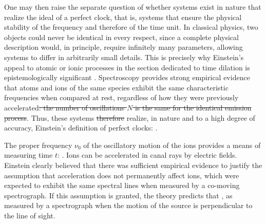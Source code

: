 \documentclass[pdflatex]{sn-jnl} %
\newcommand{\me}{; my emphasis}
\providecommand{\DIFdel}[1]{{\protect\color{red}\sout{#1}}}                      %
\providecommand{\DIFdelbegin}{} %
\providecommand{\DIFdelend}{} %
\begin{document}
One may then raise the separate question of whether systems exist in nature that realize the ideal of a perfect clock, that is, systems that ensure the physical stability of the frequency and therefore of the time unit. In classical physics, two objects could never be identical in every respect, since a complete physical description would, in principle, require infinitely many parameters, allowing systems to differ in arbitrarily small details. This is precisely why Einstein’s appeal to atomic or ionic processes in the section dedicated to time dilation is epistemologically significant \citep{Pierseaux2003}. Spectroscopy provides strong empirical evidence that atoms and ions of the same species exhibit the same characteristic frequencies when compared at rest, regardless of how they were previously accelerated\DIFdelbegin \DIFdel{: the number of oscillations $N$ is the same for the identical emission process}\DIFdelend . Thus, these systems \DIFdelbegin \DIFdel{therefore }\DIFdelend realize, in nature and to a high degree of accuracy, Einstein's definition of perfect clocks:  \citep[132--33]{Einstein1910}.

The proper frequency $\nu_0$ of the oscillatory motion of the ions provides a means of measuring time $t$:  \citep[133]{Einstein1910}. Ions can be accelerated in canal rays by electric fields. Einstein clearly believed that there was sufficient empirical evidence to justify the assumption that acceleration does not permanently affect ions, which were expected to exhibit the same spectral lines when measured by a co-moving spectrograph. If this assumption is granted, the theory predicts that  \citep[133\me]{Einstein1910}, as measured by a spectrograph when the motion of the source is perpendicular to the line of sight.
\end{document}
